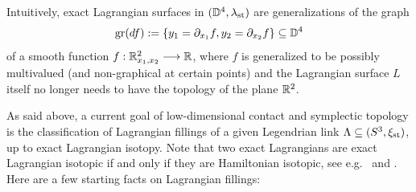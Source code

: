 \begin{remark}\label{rmk:Lagrangians_as_graphs}
Intuitively, exact Lagrangian surfaces in $(\mathbb{D}^4,\lambda_{\text{st}})$ are generalizations of the graph
\begin{equation}\label{eq:graph_df}
\operatorname{gr}(df):=\{y_1=\partial_{x_1}f,y_2=\partial_{x_2}f\}\subseteq \mathbb{D}^4
\end{equation}
of a smooth function $f:\mathbb{R}^2_{x_1,x_2}\longrightarrow\mathbb{R}$, where $f$ is generalized to be possibly multivalued (and non-graphical at certain points) and the Lagrangian surface $L$ itself no longer needs to have the topology of the plane $\mathbb{R}^2$.\sbs
\end{remark}

\noindent As said above, a current goal of low-dimensional contact and symplectic topology is the classification of Lagrangian fillings of a given Legendrian link $\Lambda\subseteq(S^3,\xi_{\text{st}})$, up to exact Lagrangian isotopy. Note that two exact Lagrangians are exact Lagrangian isotopic if and only if they are Hamiltonian isotopic, see e.g.~\cite[Section 9.3]{McDuffSalamon98} and \cite[Theorem 3.6.7]{Oh15_SymplecticTopologFloerHomology}.\\

\noindent Here are a few starting facts on Lagrangian fillings:\\

